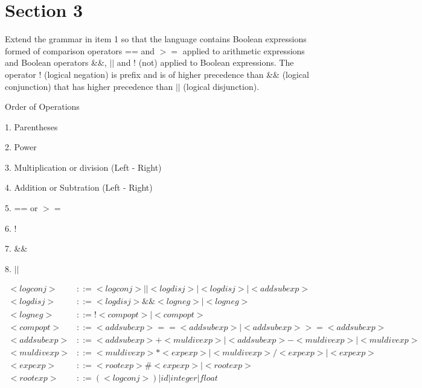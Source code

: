 \documentclass{report}
\begin{document}
\chapter{Section 3}
Extend the grammar in item 1 so that the language contains
Boolean expressions formed of comparison operators == and
$>=$ applied to arithmetic expressions and Boolean operators
\&\&, $||$ and ! (not) applied to Boolean expressions. The
operator ! (logical negation) is prefix and is of higher
precedence than \&\& (logical conjunction) that has higher
precedence than $||$ (logical disjunction).

Order of Operations

1. Parentheses

2. Power

3. Multiplication or division (Left - Right)

4. Addition or Subtration (Left - Right)

5. == or $>=$

6. !

7. \&\&

8. $||$

\begin{equation}
\begin{split}
  <logconj> & ::= <logconj> || <logdisj> | <logdisj> | <addsubexp> \\
  <logdisj> & ::= <logdisj> \&\& <logneg> | <logneg> \\
  <logneg> & ::= !<compopt> | <compopt> \\
  <compopt> & ::= <addsubexp> == <addsubexp> | <addsubexp> >= <addsubexp> \\
  <addsubexp> & ::= <addsubexp> + <muldivexp> | <addsubexp> - <muldivexp> | <muldivexp> \\
  <muldivexp> & ::= <muldivexp> * <expexp> | <muldivexp> / <expexp> | <expexp> \\
  <expexp> & ::= <rootexp> \# <expexp> | <rootexp> \\
  <rootexp> & ::= (<logconj>) |  id  |  integer  |  float \\
\end{split}
\end{equation}
\end{document}
